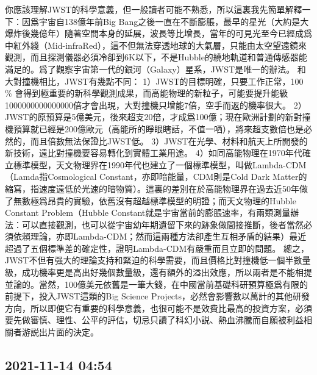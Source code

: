 \documentclass[twocolumn]{ctexart}
\begin{document}
你應該理解JWST的科學意義，但一般讀者可能不熟悉，所以這裏我先簡單解釋一下：因爲宇宙自138億年前Big Bang之後一直在不斷膨脹，最早的星光（大約是大爆炸後幾億年）隨著空間本身的延展，波長等比增長，當年的可見光至今已經成爲中紅外綫（Mid-infraRed），這不但無法穿透地球的大氣層，只能由太空望遠鏡來觀測，而且探測儀器必須冷卻到6K以下，不是Hubble的繞地軌道和普通傳感器能滿足的。爲了觀察宇宙第一代的銀河（Galaxy）星系，JWST是唯一的辦法。
和大對撞機相比，JWST有幾點不同：
1）JWST的目標明確，只要工作正常，100 \% 會得到極重要的新科學觀測成果，而高能物理的新粒子，可能要提升能級1000000000000000倍才會出現，大對撞機只增能7倍，空手而返的機率很大。
2）JWST的原預算是5億美元，後來超支20倍，才成爲100億；現在歐洲計劃的新對撞機預算就已經是200億歐元（高能所的睜眼瞎話，不值一哂），將來超支數倍也是必然的，而且倍數無法保證比JWST低。
3）JWST在光學、材料和航天上所開發的新技術，遠比對撞機要容易轉化到實體工業用途。
4）如同高能物理在1970年代確立標準模型，天文物理界在1990年代也建立了一個標準模型，叫做Lambda-CDM（Lamda指Cosmological Constant，亦即暗能量，CDM則是Cold Dark Matter的縮寫，指速度遠低於光速的暗物質）。這裏的差別在於高能物理界在過去近50年做了無數極爲昂貴的實驗，依舊沒有超越標準模型的明證；而天文物理的Hubble Constant Problem（Hubble Constant就是宇宙當前的膨脹速率，有兩類測量辦法：可以直接觀測，也可以從宇宙幼年期遺留下來的跡象做間接推斷，後者當然必須依賴理論，亦即Lambda-CDM；然而這兩種方法卻產生互相矛盾的結果）最近超過了五個標準差的確定性，證明Lambda-CDM有嚴重而且立即的問題。
總之，JWST不但有强大的理論支持和緊迫的科學需要，而且價格比對撞機低一個半數量級，成功機率更是高出好幾個數量級，還有額外的溢出效應，所以兩者是不能相提並論的。當然，100億美元依舊是一筆大錢，在中國當前基礎科研預算極爲有限的前提下，投入JWST這類的Big Science Projects，必然會影響數以萬計的其他研發方向，所以即便它有重要的科學意義，也很可能不是效費比最高的投資方案，必須要先做審慎、理性、公平的評估，切忌只讀了科幻小説、熱血沸騰而自願被利益相關者游説出片面的決定。
\subsection*{2021-11-14 04:54}
\end{document}
